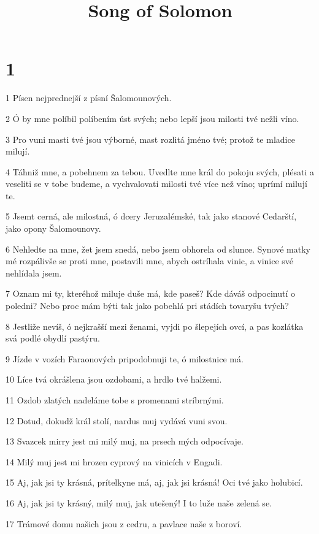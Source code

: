 

\title{Song of Solomon}

\chapter{1}

\par 1 Písen nejprednejší z písní Šalomounových.
\par 2 Ó by mne políbil políbením úst svých; nebo lepší jsou milosti tvé nežli víno.
\par 3 Pro vuni masti tvé jsou výborné, mast rozlitá jméno tvé; protož te mladice milují.
\par 4 Táhniž mne, a pobehnem za tebou. Uvedlte mne král do pokoju svých, plésati a veseliti se v tobe budeme, a vychvalovati milosti tvé více než víno; uprímí milují te.
\par 5 Jsemt cerná, ale milostná, ó dcery Jeruzalémské, tak jako stanové Cedarští, jako opony Šalomounovy.
\par 6 Nehledte na mne, žet jsem snedá, nebo jsem obhorela od slunce. Synové matky mé rozpálivše se proti mne, postavili mne, abych ostríhala vinic, a vinice své nehlídala jsem.
\par 7 Oznam mi ty, kteréhož miluje duše má, kde paseš? Kde dáváš odpocinutí o poledni? Nebo proc mám býti tak jako pobehlá pri stádích tovaryšu tvých?
\par 8 Jestliže nevíš, ó nejkrašší mezi ženami, vyjdi po šlepejích ovcí, a pas kozlátka svá podlé obydlí pastýru.
\par 9 Jízde v vozích Faraonových pripodobnuji te, ó milostnice má.
\par 10 Líce tvá okrášlena jsou ozdobami, a hrdlo tvé halžemi.
\par 11 Ozdob zlatých nadeláme tobe s promenami stríbrnými.
\par 12 Dotud, dokudž král stolí, nardus muj vydává vuni svou.
\par 13 Svazcek mirry jest mi milý muj, na prsech mých odpocívaje.
\par 14 Milý muj jest mi hrozen cyprový na vinicích v Engadi.
\par 15 Aj, jak jsi ty krásná, prítelkyne má, aj, jak jsi krásná! Oci tvé jako holubicí.
\par 16 Aj, jak jsi ty krásný, milý muj, jak utešený! I to luže naše zelená se.
\par 17 Trámové domu našich jsou z cedru, a pavlace naše z boroví.

